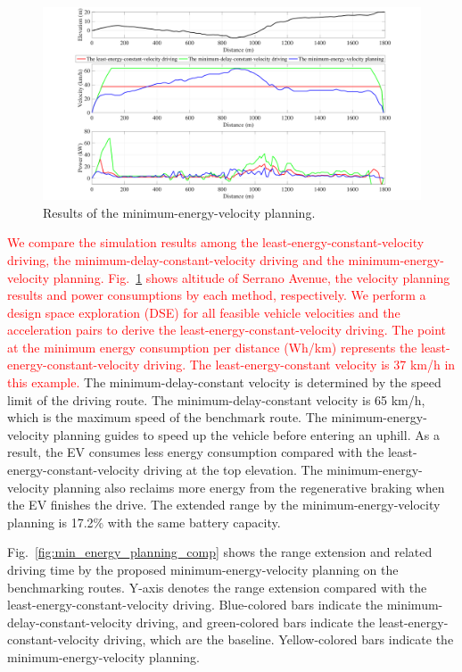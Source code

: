 \documentclass{IEEEtran}
\begin{document}

\begin{figure}[h!]	%
\centering
\includegraphics[width=1.0\hsize]{Figures/energy_driving_profile_best.pdf}
\caption{Results of the minimum-energy-velocity planning.}
\label{fig:no_deadline_trace}
\end{figure} 

\textcolor{red}{We compare the simulation results among the least-energy-constant-velocity driving, the minimum-delay-constant-velocity driving and the minimum-energy-velocity planning. Fig.~\ref{fig:no_deadline_trace} shows altitude of Serrano Avenue, the velocity planning results and power consumptions by each method, respectively. 
We perform a design space exploration (DSE) for all feasible vehicle velocities and the acceleration pairs to derive the least-energy-constant-velocity driving. The point at the minimum energy consumption per distance (Wh/km) represents the least-energy-constant-velocity driving. The least-energy-constant velocity is 37 km/h in this example.}
The minimum-delay-constant velocity is determined by the speed limit of the driving route. The minimum-delay-constant velocity is 65 km/h, which is the maximum speed of the benchmark route.
The minimum-energy-velocity planning guides to speed up the vehicle before entering an uphill. As a result, the EV consumes less energy consumption compared with the least-energy-constant-velocity driving at the top elevation. The minimum-energy-velocity planning also reclaims more energy from the regenerative braking when the EV finishes the drive. The extended range by the minimum-energy-velocity planning is 17.2\% with the same battery capacity.

Fig.~\ref{fig:min_energy_planning_comp} shows the range extension and related driving time by the proposed minimum-energy-velocity planning on the benchmarking routes. Y-axis denotes the range extension compared with the least-energy-constant-velocity driving. Blue-colored bars indicate the minimum-delay-constant-velocity driving, and green-colored bars indicate the least-energy-constant-velocity driving, which are the baseline. Yellow-colored bars indicate the minimum-energy-velocity planning.
\end{document}
